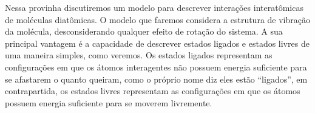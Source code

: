 \documentclass[]{IMTexam}
\author{Isabella B.}
\date{}
\begin{document}
\maketitle

Nessa provinha discutiremos um modelo para descrever interações interatômicas de moléculas diatômicas. O modelo que faremos considera a estrutura de vibração da molécula, desconsiderando qualquer efeito de rotação do sistema. A sua principal vantagem é a capacidade de descrever estados ligados e estados livres de uma maneira simples, como veremos. Os estados ligados representam as configurações em que os átomos interagentes não possuem energia suficiente para se afastarem o quanto queiram, como o próprio nome diz eles estão ``ligados'', em contrapartida, os estados livres representam as configurações em que os átomos possuem energia suficiente para se moverem livremente.
\end{document}
